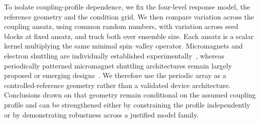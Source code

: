 \documentclass[aip,jap,reprint,superscriptaddress,longbibliography,floatfix]{revtex4-2}
\begin{document}
To isolate coupling-profile dependence, we fix the four-level response model,
the reference geometry and the condition grid. We then compare variation across
the coupling ansatz, using common random numbers, with variation across seed
blocks at fixed ansatz, and track both over ensemble size. Each ansatz is a
scalar kernel multiplying the same minimal spin--valley operator. Micromagnets
and electron shuttling are individually established
experimentally~\cite{yoneda_quantum-dot_2018,unseld_baseband_2025,de_smet_high-fidelity_2025,seidler_conveyor-mode_2022},
whereas periodically patterned micromagnet shuttling architectures remain
largely proposed or emerging
designs~\cite{kunne_spinbus_2024,langrock_blueprint_2023,unseld_baseband_2025}.
We therefore use the periodic array as a controlled-reference geometry rather
than a validated device architecture. Conclusions drawn on that geometry
remain conditional on the assumed coupling profile and can be strengthened
either by constraining the profile independently or by demonstrating robustness
across a justified model family.
\end{document}
